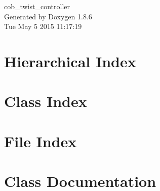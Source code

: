 \documentclass[twoside]{book}
\newcommand{\clearemptydoublepage}{%
  \newpage{\pagestyle{empty}\cleardoublepage}%
}
\begin{document}
\hypersetup{pageanchor=false}
\begin{titlepage}
\vspace*{7cm}
\begin{center}%
{\Large cob\-\_\-twist\-\_\-controller }\\
\vspace*{1cm}
{\large Generated by Doxygen 1.8.6}\\
\vspace*{0.5cm}
{\small Tue May 5 2015 11:17:19}\\
\end{center}
\end{titlepage}
\clearemptydoublepage
\tableofcontents
\clearemptydoublepage
{}
\hypersetup{pageanchor=true}

\chapter{Hierarchical Index}

\chapter{Class Index}

\chapter{File Index}

\chapter{Class Documentation}






















\end{document}
